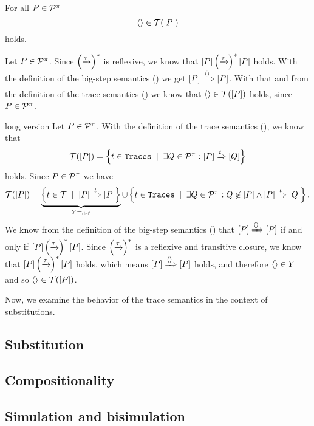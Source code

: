\begin{lemma}
\label{lem_empty_trace}
For all $P\in\mathcal P^{\pi}$
\[\eseq\in\traces[P]\]
holds.
\end{lemma}
\begin{prf}
Let $P\in\mathcal P^{\pi}$. Since $\left(\xrightarrow{\tau}\right)^*$ is reflexive, we know that $\left[P\right]\left(\xrightarrow{\tau}\right)^*\left[P\right]$ holds. With the definition of the big-step semantics () we get $\left[P\right]\xRightarrow{\langle\rangle}\left[P\right]$. With that and from the definition of the trace semantics () we know that $\eseq\in\traces[P]$ holds, since $P\in\mathcal P^{\pi}$.
\begin{old}{long version}
	Let $P\in\mathcal P^{\pi}$. With the definition of the trace semantics (), we know that
		\[\traces[P] = \set[\exists{}Q\in\procs:\ec{P}\bigstep{t}\ec{Q}]{t\in\tr}\]
	holds. Since $P\in\mathcal P^{\pi}$ we have
	\[\traces[P]=\underbrace{\set[\ec{P}\bigstep{t}\ec{P}]{t\in\traces}}_{Y\define} \cup \set[\exists{}Q\in\procs: Q\nin\ec{P} \wedge\ec{P}\bigstep{t}\ec{Q}]{t\in\tr}.\]
	We know from the definition of the big-step semantics () that $\left[P\right]\xRightarrow{\langle\rangle}\left[P\right]$ if and only if $\left[P\right]\left(\xrightarrow{\tau}\right)^*\left[P\right]$. Since $\left(\xrightarrow{\tau}\right)^*$ is a reflexive and transitive closure, we know that $\left[P\right]\left(\xrightarrow{\tau}\right)^*\left[P\right]$ holds, which means $\left[P\right]\xRightarrow{\langle\rangle}\left[P\right]$ holds, and therefore $\langle\rangle{}\in{}Y$ and so $\eseq\in\traces[P]$.
\end{old}
\end{prf}

Now, we examine the behavior of the trace semantics in the context of substitutions.

\subsection{Substitution}
\label{sec_de_sem_trace_prop_subst}


\subsection{Compositionality}
\label{sec_de_sem_trace_prop_comp}


\subsection{Simulation and bisimulation}
\label{_sec_de_sem_trace_sim_bisim}

